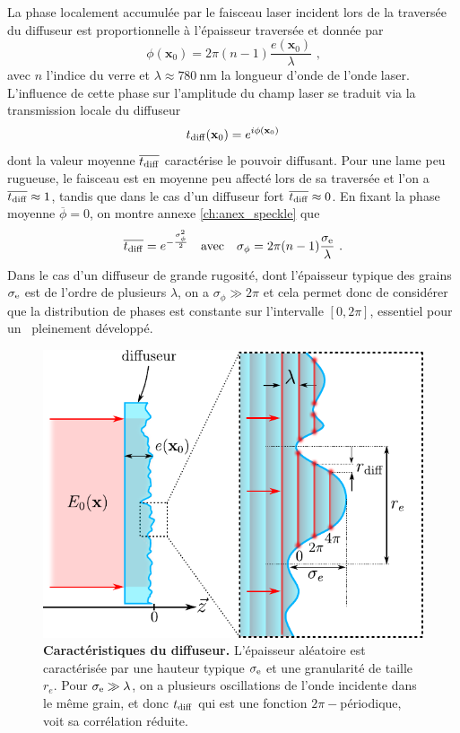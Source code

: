 La phase localement accumulée par le faisceau laser incident lors de la traversée du diffuseur est proportionnelle à l'épaisseur traversée et donnée par
\begin{equation}
\phi(\mathbf{x}_0)=2\pi (n-1) \frac{e(\mathbf{x}_0)}{\lambda} \text{ ,}
\end{equation}
avec $n$ l'indice du verre et $\lambda\approx \SI{780}{\nano\metre}$ la longueur d'onde de l'onde laser. L'influence de cette phase sur l'amplitude du champ laser se traduit via la transmission locale du diffuseur
\begin{equation}
t_{\mathrm{diff}}(\mathbf{x}_0)=e^{i\phi(\mathbf{x}_0)}
\end{equation}
dont la valeur moyenne $\overline{t_{\mathrm{diff}}}$ caractérise le pouvoir diffusant. Pour une lame peu rugueuse, le faisceau est en moyenne peu affecté lors de sa traversée et l'on a $\overline{t_{\mathrm{diff}}}\approx 1$, tandis que dans le cas d'un diffuseur fort $\overline{t_{\mathrm{diff}}} \approx 0$. En fixant la phase moyenne $\overline{\phi}=0$, on montre annexe \ref{ch:anex_speckle} que \citep{denechaud2018vers}
\begin{equation}
\overline{t_{\mathrm{diff}}}=e^{-\frac{\sigma_{\phi}^2}{2}} \quad \text{avec} \quad \sigma_\phi=2\pi (n-1) \frac{\sigma_{\mathrm{e}}}{\lambda} \text{ .}
\label{eq:sigma_phi}
\end{equation}
Dans le cas d'un diffuseur de grande rugosité, dont l'épaisseur typique des grains $\sigma_{\mathrm{e}}$ est de l'ordre de plusieurs $\lambda$, on a $\sigma_\phi \gg 2\pi$ et cela permet donc de considérer que la distribution de phases est constante sur l'intervalle $\left[0,2\pi \right]$, essentiel pour un \speckle\ pleinement développé.

\begin{figure}
\centering
\includegraphics[scale=1]{Fig/Speckle/diffus_prop.pdf}
\caption{\textbf{Caractéristiques du diffuseur.} L'épaisseur aléatoire est caractérisée par une hauteur typique $\sigma_{\mathrm{e}}$ et une granularité de taille $r_e$. Pour $\sigma_{\mathrm{e}} \gg \lambda$, on a plusieurs oscillations de l'onde incidente dans le même grain, et donc $t_{\mathrm{diff}}$ qui est une fonction $2\pi-$périodique, voit sa corrélation réduite.}
\label{fig:diffus_prop}
\end{figure}

